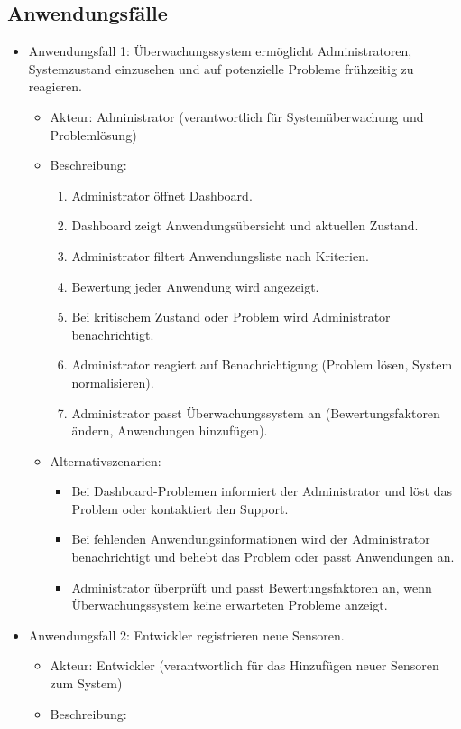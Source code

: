 \begin{flushleft}
\subsection{Anwendungsfälle}
\begin{itemize}
	\item Anwendungsfall 1: Überwachungssystem ermöglicht Administratoren, Systemzustand einzusehen und auf potenzielle Probleme frühzeitig zu reagieren.
	\begin{itemize}
	\item Akteur: Administrator (verantwortlich für Systemüberwachung und Problemlösung)
	\item Beschreibung:
	\begin{enumerate}
	\item Administrator öffnet Dashboard.
	\item Dashboard zeigt Anwendungsübersicht und aktuellen Zustand.
	\item Administrator filtert Anwendungsliste nach Kriterien.
	\item Bewertung jeder Anwendung wird angezeigt.
	\item Bei kritischem Zustand oder Problem wird Administrator benachrichtigt.
	\item Administrator reagiert auf Benachrichtigung (Problem lösen, System normalisieren).
	\item Administrator passt Überwachungssystem an (Bewertungsfaktoren ändern, Anwendungen hinzufügen).
	\end{enumerate}
	\item Alternativszenarien:
	\begin{itemize}
	\item Bei Dashboard-Problemen informiert der Administrator und löst das Problem oder kontaktiert den Support.
	\item Bei fehlenden Anwendungsinformationen wird der Administrator benachrichtigt und behebt das Problem oder passt Anwendungen an.
	\item Administrator überprüft und passt Bewertungsfaktoren an, wenn Überwachungssystem keine erwarteten Probleme anzeigt.
	\end{itemize}
	\end{itemize}
	\item Anwendungsfall 2: Entwickler registrieren neue Sensoren.
	\begin{itemize}
		\item Akteur: Entwickler (verantwortlich für das Hinzufügen neuer Sensoren zum System)
		\item Beschreibung:

\end{itemize}
\end{itemize}
\end{flushleft}
